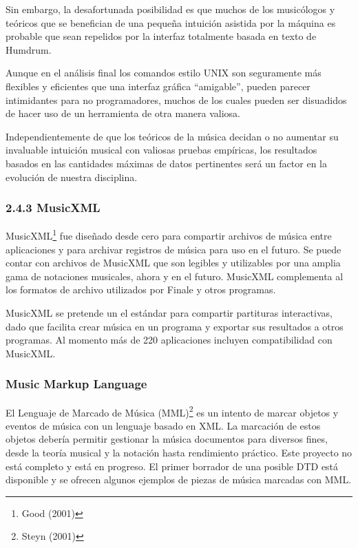 \documentclass[]{article}
\begin{document}
Sin embargo, la desafortunada posibilidad es que muchos de los
musicólogos y teóricos que se benefician de una pequeña intuición
asistida por la máquina es probable que sean repelidos por la interfaz
totalmente basada en texto de Humdrum.

Aunque en el análisis final los comandos estilo UNIX son seguramente más
flexibles y eficientes que una interfaz gráfica ``amigable'', pueden
parecer intimidantes para no programadores, muchos de los cuales pueden
ser disuadidos de hacer uso de un herramienta de otra manera valiosa.

Independientemente de que los teóricos de la música decidan o no
aumentar su invaluable intuición musical con valiosas pruebas empíricas,
los resultados basados en las cantidades máximas de datos pertinentes
será un factor en la evolución de nuestra disciplina.

\hypertarget{musicxml}{%
\subsubsection{2.4.3 MusicXML}\label{musicxml}}

MusicXML\footnote{Good (2001)} fue diseñado desde cero para compartir
archivos de música entre aplicaciones y para archivar registros de
música para uso en el futuro. Se puede contar con archivos de MusicXML
que son legibles y utilizables por una amplia gama de notaciones
musicales, ahora y en el futuro. MusicXML complementa al los formatos de
archivo utilizados por Finale y otros programas.

MusicXML se pretende un el estándar para compartir partituras
interactivas, dado que facilita crear música en un programa y exportar
sus resultados a otros programas. Al momento más de 220 aplicaciones
incluyen compatibilidad con MusicXML.

\hypertarget{music-markup-language}{%
\subsubsection{Music Markup Language}\label{music-markup-language}}

El Lenguaje de Marcado de Música (MML)\footnote{Steyn (2001)} es un
intento de marcar objetos y eventos de música con un lenguaje basado en
XML. La marcación de estos objetos debería permitir gestionar la música
documentos para diversos fines, desde la teoría musical y la notación
hasta rendimiento práctico. Este proyecto no está completo y está en
progreso. El primer borrador de una posible DTD está disponible y se
ofrecen algunos ejemplos de piezas de música marcadas con MML.
\end{document}
